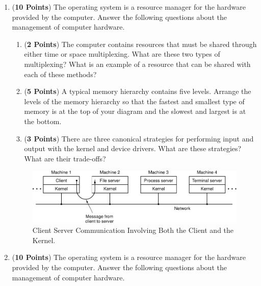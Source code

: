\documentclass[12pt,epsf,psfig,graphics]{article}
\begin{document}
\begin{enumerate}
  
\item ({\bf 10 Points}) The operating system is a resource manager for the hardware provided by the computer.  Answer
  the following questions about the management of computer hardware.

  \begin{enumerate}
          
  \item ({\bf 2 Points}) The computer contains resources that must be shared through either time or space multiplexing.
    What are these two types of multiplexing? What is an example of a resource that can be shared with each of these
    methods?
   
  \item ({\bf 5 Points}) A typical memory hierarchy contains five levels.  Arrange the levels of the memory hierarchy so
    that the fastest and smallest type of memory is at the top of your diagram and the slowest and largest is at the
    bottom.
  
  \item ({\bf 3 Points}) There are three canonical strategies for performing input and output with the
    kernel and device drivers.  What are these strategies? What are their trade-offs?

  \end{enumerate}
        
\newpage

\begin{figure}[t]
  \centering
  \includegraphics{fig1-27}
  \caption{Client Server Communication Involving Both the Client and the Kernel.}
  \label{fig:clientserver}
\end{figure}

\item ({\bf 10 Points}) The operating system is a resource manager for the hardware provided by the computer.  Answer
  the following questions about the management of computer hardware.

  \begin{enumerate}
          

\end{enumerate}
\end{enumerate}
\end{document}
